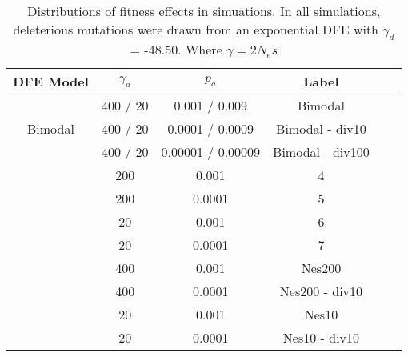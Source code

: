 


\begin{table}
\centering

\caption{Distributions of fitness effects in simuations. In all simulations, deleterious mutations were drawn from an exponential DFE with $\gamma_d$ = -48.50. Where $\gamma = 2N_es$}
 \begin{tabular}{c c c c c c} 

  \hline
  DFE Model & $\gamma_a$ & $p_a$ & Label \\ [0.5ex] 
 \hline
 \multirow{3}{*}{Bimodal} & 400 / 20 & 0.001 / 0.009 & Bimodal \\
 						 & 400 / 20 & 0.0001 / 0.0009 & Bimodal - div10 \\
 						 & 400 / 20  & 0.00001 / 0.00009  & Bimodal - div100 \\
 \hdashline
 \multirow{4}{*}{Exponential} & 200 & 0.001 & 4 \\
 						  & 200 & 0.0001 & 5 \\
 						  & 20 & 0.001 & 6 \\
 						  & 20 & 0.0001 & 7 \\
  \hdashline						 
  \multirow{4}{*}{Fixed} & 400 & 0.001 & Nes200 \\
 						  & 400 & 0.0001 & Nes200 - div10 \\
 						  & 20 & 0.001 & Nes10 \\
 						  & 20 & 0.0001 & Nes10 - div10 \\
\hline
\end{tabular}    

\end{table}
